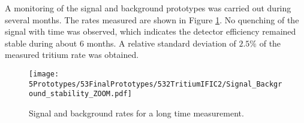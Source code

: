 



A monitoring of the signal and background prototypes was carried out during several months. The rates measured are shown in Figure \ref{fig:MonitorizationTRITIUMIFIC2}. No quenching of the signal with time was observed, which indicates the detector efficiency remained stable during about 6 months. A relative standard deviation of $2.5\%$ of the measured tritium rate was obtained.

\begin{figure}[h]
\centering
\texttt{[image: 5Prototypes/53FinalPrototypes/532TritiumIFIC2/Signal\_Background\_stability\_ZOOM.pdf]}
\caption{Signal and background rates for a long time measurement.\label{fig:MonitorizationTRITIUMIFIC2}}
\end{figure}

